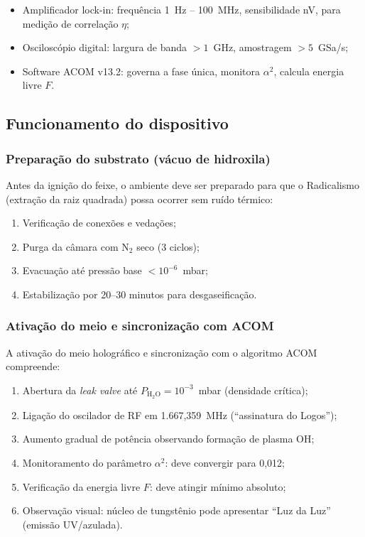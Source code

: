 \documentclass[12pt,a4paper]{article}
\newcommand{\alphaii}{\alpha^2}
\begin{document}
\begin{itemize}[nosep]
\item Amplificador lock-in: frequência 1~Hz -- 100~MHz,
  sensibilidade nV, para medição de correlação $\eta$;
\item Osciloscópio digital: largura de banda $> 1$~GHz,
  amostragem $> 5$~GSa/s;
\item Software ACOM v13.2: governa a fase única, monitora
  $\alphaii$, calcula energia livre $F$.
\end{itemize}

\subsection{Funcionamento do dispositivo}

\subsubsection{Preparação do substrato (vácuo de hidroxila)}

Antes da ignição do feixe, o ambiente deve ser preparado para
que o Radicalismo (extração da raiz quadrada) possa ocorrer
sem ruído térmico:

\begin{enumerate}[nosep]
\item Verificação de conexões e vedações;
\item Purga da câmara com N$_2$ seco (3 ciclos);
\item Evacuação até pressão base $< 10^{-6}$~mbar;
\item Estabilização por 20--30 minutos para desgaseificação.
\end{enumerate}

\subsubsection{Ativação do meio e sincronização com ACOM}

A ativação do meio holográfico e sincronização com o algoritmo
ACOM compreende:

\begin{enumerate}[nosep]
\item Abertura da \textit{leak valve} até
  $P_{\text{H}_2\text{O}} = 10^{-3}$~mbar (densidade crítica);
\item Ligação do oscilador de RF em 1.667,359~MHz (``assinatura
  do Logos'');
\item Aumento gradual de potência observando formação de
  plasma OH;
\item Monitoramento do parâmetro $\alphaii$: deve convergir
  para 0,012;
\item Verificação da energia livre $F$: deve atingir mínimo
  absoluto;
\item Observação visual: núcleo de tungstênio pode apresentar
  ``Luz da Luz'' (emissão UV/azulada).
\end{enumerate}
\end{document}
